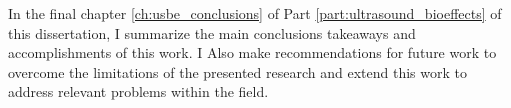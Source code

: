 In the final chapter \ref{ch:usbe_conclusions} of Part
\ref{part:ultrasound_bioeffects} of this dissertation, I summarize
the main conclusions takeaways and accomplishments of this work. I
Also make recommendations for future work to overcome the limitations
of the presented research and extend this work to address relevant
problems within the field.

